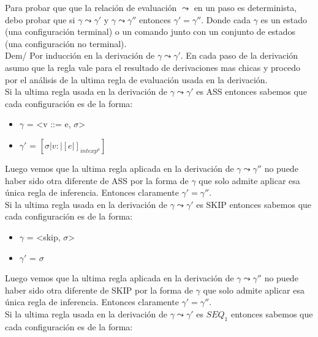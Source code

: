 \documentclass[a4paper,12pt]{article}
\begin{document}
Para probar que que la relación de evaluación $\leadsto$ en un paso es determinista, debo 
probar que si $ \gamma \leadsto \gamma'$ y $\gamma \leadsto \gamma''$ entonces $\gamma' = \gamma''$.
Donde cada $\gamma$ es un estado (una configuración terminal) o un comando junto con un conjunto de 
estados (una configuración no terminal).\\

Dem/ Por inducción en la derivación de $ \gamma \leadsto \gamma'$. En cada paso de la derivación
asumo que la regla vale para el resultado de derivaciones mas chicas y procedo por el análisis
de la ultima regla de evaluación usada en la derivación.\\

Si la ultima regla usada en la derivación de $\gamma \leadsto \gamma'$ es ASS entonces sabemos que 
cada configuración es de la forma:

\begin{itemize}
  \item $\gamma$ = \textless v ::= e, $\sigma$\textgreater
  \item $\gamma'$ =  $[ \sigma | v: |[e|]_{intexp^{\sigma}}]$ 
\end{itemize}

Luego vemos que la ultima regla aplicada en la derivación de $\gamma \leadsto \gamma''$ 
no puede haber sido otra diferente de ASS por la forma de $\gamma$ que solo admite 
aplicar esa única regla de inferencia. Entonces claramente $\gamma' = \gamma''$.\\


Si la ultima regla usada en la derivación de $\gamma \leadsto \gamma'$ es SKIP entonces sabemos que 
cada configuración es de la forma:

\begin{itemize}
  \item $\gamma$ = \textless skip, $\sigma$\textgreater
  \item $\gamma'$ =  $\sigma$ 
\end{itemize}

Luego vemos que la ultima regla aplicada en la derivación de $\gamma \leadsto \gamma''$ 
no puede haber sido otra diferente de SKIP por la forma de $\gamma$ que solo admite 
aplicar esa única regla de inferencia. Entonces claramente $\gamma' = \gamma''$.\\

Si la ultima regla usada en la derivación de $\gamma \leadsto \gamma'$ es $SEQ_{1}$ entonces sabemos que 
cada configuración es de la forma:
\end{document}
